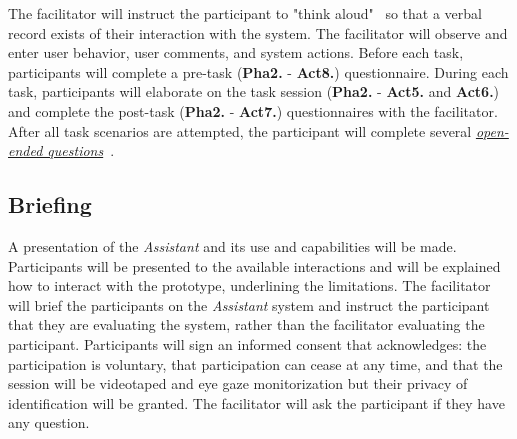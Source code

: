 The facilitator will instruct the participant to "think aloud"~\cite{bolle2016authors, kilsdonk2016uncovering} so that a verbal record exists of their interaction with the system. The facilitator will observe and enter user behavior, user comments, and system actions. Before each task, participants will complete a pre-task (\textbf{Pha2.} - \textbf{Act8.}) questionnaire. During each task, participants will elaborate on the task session (\textbf{Pha2.} - \textbf{Act5.} and \textbf{Act6.}) and complete the post-task (\textbf{Pha2.} - \textbf{Act7.}) questionnaires with the facilitator. After all task scenarios are attempted, the participant will complete several {\it \hyperlink{https://www.nngroup.com/articles/open-ended-questions/}{open-ended questions}}~\cite{abelson2016supporting, merchant2018digital}.



\subsection{Briefing}

A presentation of the \textit{Assistant} and its use and capabilities will be made. Participants will be presented to the available interactions and will be explained how to interact with the prototype, underlining the limitations. The facilitator will brief the participants on the \textit{Assistant} system and instruct the participant that they are evaluating the system, rather than the facilitator evaluating the participant. Participants will sign an informed consent that acknowledges: the participation is voluntary, that participation can cease at any time, and that the session will be videotaped and eye gaze monitorization but their privacy of identification will be granted. The facilitator will ask the participant if they have any question.




